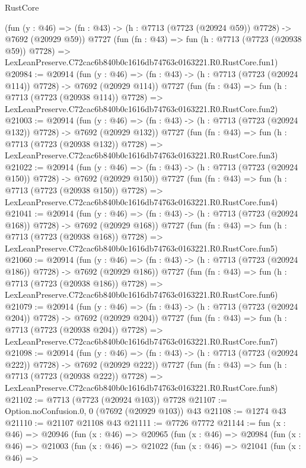 \begin{lexlean}{RustCore}
\begin{coremodule}
    (fun (y : @46) => (fn : @43) -> (h : @7713 (@7723 (@20924 @59)) @7728) -> @7692 (@20929 @59))
    @7727
    (fun (fn : @43) =>
    fun (h : @7713 (@7723 (@20938 @59)) @7728) =>
    LexLeanPreserve.C72cac6b840b0c1616db74763c0163221.R0.RustCore.fun1)
@20984 := @20914
    (fun (y : @46) => (fn : @43) -> (h : @7713 (@7723 (@20924 @114)) @7728) -> @7692 (@20929 @114))
    @7727
    (fun (fn : @43) =>
    fun (h : @7713 (@7723 (@20938 @114)) @7728) =>
    LexLeanPreserve.C72cac6b840b0c1616db74763c0163221.R0.RustCore.fun2)
@21003 := @20914
    (fun (y : @46) => (fn : @43) -> (h : @7713 (@7723 (@20924 @132)) @7728) -> @7692 (@20929 @132))
    @7727
    (fun (fn : @43) =>
    fun (h : @7713 (@7723 (@20938 @132)) @7728) =>
    LexLeanPreserve.C72cac6b840b0c1616db74763c0163221.R0.RustCore.fun3)
@21022 := @20914
    (fun (y : @46) => (fn : @43) -> (h : @7713 (@7723 (@20924 @150)) @7728) -> @7692 (@20929 @150))
    @7727
    (fun (fn : @43) =>
    fun (h : @7713 (@7723 (@20938 @150)) @7728) =>
    LexLeanPreserve.C72cac6b840b0c1616db74763c0163221.R0.RustCore.fun4)
@21041 := @20914
    (fun (y : @46) => (fn : @43) -> (h : @7713 (@7723 (@20924 @168)) @7728) -> @7692 (@20929 @168))
    @7727
    (fun (fn : @43) =>
    fun (h : @7713 (@7723 (@20938 @168)) @7728) =>
    LexLeanPreserve.C72cac6b840b0c1616db74763c0163221.R0.RustCore.fun5)
@21060 := @20914
    (fun (y : @46) => (fn : @43) -> (h : @7713 (@7723 (@20924 @186)) @7728) -> @7692 (@20929 @186))
    @7727
    (fun (fn : @43) =>
    fun (h : @7713 (@7723 (@20938 @186)) @7728) =>
    LexLeanPreserve.C72cac6b840b0c1616db74763c0163221.R0.RustCore.fun6)
@21079 := @20914
    (fun (y : @46) => (fn : @43) -> (h : @7713 (@7723 (@20924 @204)) @7728) -> @7692 (@20929 @204))
    @7727
    (fun (fn : @43) =>
    fun (h : @7713 (@7723 (@20938 @204)) @7728) =>
    LexLeanPreserve.C72cac6b840b0c1616db74763c0163221.R0.RustCore.fun7)
@21098 := @20914
    (fun (y : @46) => (fn : @43) -> (h : @7713 (@7723 (@20924 @222)) @7728) -> @7692 (@20929 @222))
    @7727
    (fun (fn : @43) =>
    fun (h : @7713 (@7723 (@20938 @222)) @7728) =>
    LexLeanPreserve.C72cac6b840b0c1616db74763c0163221.R0.RustCore.fun8)
@21102 := @7713 (@7723 (@20924 @103)) @7728
@21107 := Option.noConfusion.{0, 0} (@7692 (@20929 @103)) @43
@21108 := @1274 @43
@21110 := @21107 @21108 @43
@21111 := @7726 @7772
@21144 := fun (x : @46) =>
  @20946
    (fun (x : @46) =>
    @20965
      (fun (x : @46) =>
      @20984
        (fun (x : @46) =>
        @21003
          (fun (x : @46) =>
          @21022
            (fun (x : @46) =>
            @21041
              (fun (x : @46) =>

\end{coremodule}
\end{lexlean}
